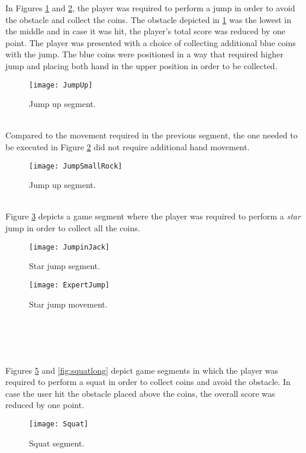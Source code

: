 In Figures \ref{fig:jumpup} and \ref{fig:jumpssmallrock}, the player was required to perform a jump in order to avoid the obstacle and collect the coins. The obstacle depicted in \ref{fig:jumpup} was the lowest in the middle and in case it was hit, the player's total score was reduced by one point. The player was presented with a choice of collecting additional blue coins with the jump. The blue coins were positioned in a way that required higher jump and placing both hand in the upper position in order to be collected.\\
\begin{figure}[h]
    \centering
    \texttt{[image: JumpUp]}
    \caption{Jump up segment.}
    \label{fig:jumpup}
\end{figure}\\
Compared to the movement required in the previous segment, the one needed to be executed in Figure \ref{fig:jumpssmallrock} did not require additional hand movement.\\
\begin{figure}[h]
    \centering
    \texttt{[image: JumpSmallRock]}
    \caption{Jump up segment.}
    \label{fig:jumpssmallrock}
\end{figure}\\
Figure \ref{fig:star} depicts a game segment where the player was required to perform a \textit{star} jump in order to collect all the coins.\\
\begin{figure}[h]
    \centering
    \texttt{[image: JumpinJack]}
    \caption{Star jump segment.}
    \label{fig:star}
\end{figure}
\begin{figure}[h]
    \centering
    \texttt{[image: ExpertJump]}
    \caption{Star jump movement.}
    \label{fig:expertstarjump}
\end{figure}\\\\\\\\
Figures \ref{fig:squat} and \ref{fig:squatlong} depict game segments in which the player was required to perform a squat in order to collect coins and avoid the obstacle. In case the user hit the obstacle placed above the coins, the overall score was reduced by one point.\\
\begin{figure}[h]
    \centering
    \texttt{[image: Squat]}
    \caption{Squat segment.}
    \label{fig:squat}
\end{figure}

